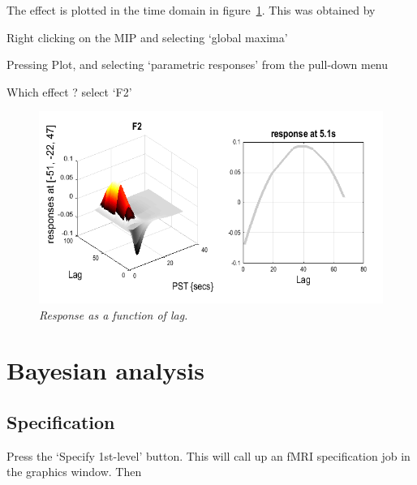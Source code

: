 The effect is plotted in the time domain in figure~\ref{famous_lag}. This was obtained by

\bi
\item{Right clicking on the MIP and selecting `global maxima'}
\item{Pressing Plot, and selecting `parametric responses' from the pull-down menu}
\item{Which effect ? select `F2'}
\ei

\begin{figure}
\begin{center}
\includegraphics[width=150mm]{faces/famous_lag}
\caption{\em Response as a function of lag. \label{famous_lag} }
\end{center}
\end{figure}

\section{Bayesian analysis}

\subsection{Specification}

Press the `Specify 1st-level' button. This will call up an fMRI specification job in the graphics window. Then

